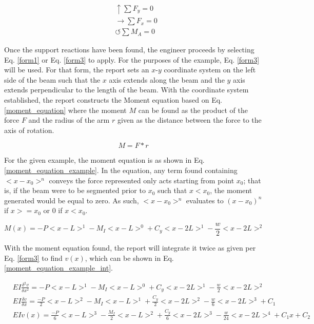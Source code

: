 \documentclass[a4paper]{article}
\begin{document}
\begin{equation}
    \begin{split}
    &\uparrow \sum F_y = 0 \\
    &\rightarrow \sum F_x = 0 \\
    &\circlearrowleft \sum M_A = 0
    \end{split}
\label{static_equations}
\end{equation}

Once the support reactions have been found, the engineer proceeds by selecting Eq. \ref{form1} or Eq. \ref{form3} to apply. For the purposes of the example, Eq. \ref{form3} will be used. For that form, the report sets an $x$-$y$ coordinate system on the left side of the beam such that the $x$ axis extends along the beam and the $y$ axis extends perpendicular to the length of the beam. With the coordinate system established, the report constructs the Moment equation based on Eq. \ref{moment_equation} where the moment $M$ can be found as the product of the force $F$ and the radius of the arm $r$ given as the distance between the force to the axis of rotation.

\begin{equation}
    M = F * r
\label{moment_equation}
\end{equation}

For the given example, the moment equation is as shown in Eq. \ref{moment_equation_example}. In the equation, any term found containing $<x-x_0>^n$ conveys the force represented only acts starting from point $x_0$; that is, if the beam were to be segmented prior to $x_0$ such that $x<x_0$, the moment generated would be equal to zero. As such, $<x-x_0>^n$ evaluates to $(x-x_0)^n$ if $x>=x_0$ or $0$ if $x<x_0$.

\begin{equation}
    M(x) = -P<x-L>^1 - M_I<x-L>^0 + C_y<x-2L>^1 - \frac{w}{2}<x-2L>^2
\label{moment_equation_example}
\end{equation}

With the moment equation found, the report will integrate it twice as given per Eq. \ref{form3} to find $v(x)$, which can be shown in Eq. \ref{moment_equation_example_int}.

\begin{equation}
    \begin{split}
    & EI \frac{\delta^2 v}{\delta x^2} = -P<x-L>^1 - M_I<x-L>^0 + C_y<x-2L>^1 - \frac{w}{2}<x-2L>^2 \\
    & EI \frac{\delta v}{\delta x} = \frac{-P}{2}<x-L>^2 - M_I<x-L>^1 + \frac{C_y}{2}<x-2L>^2 -  \frac{w}{6}<x-2L>^3 + C_1\\
    & EI v(x) = \frac{-P}{6}<x-L>^3 - \frac{M_I}{2}<x-L>^2 + \frac{C_y}{6}<x-2L>^3 - \frac{w}{24}<x-2L>^4 + C_1 x + C_2
    \end{split}
\label{moment_equation_example_int}
\end{equation}
\end{document}
